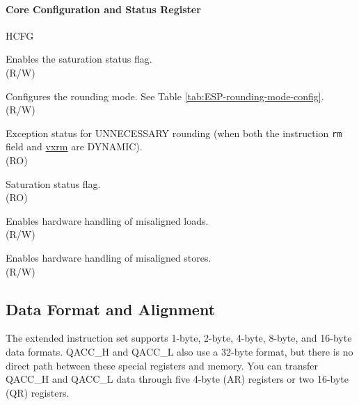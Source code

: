 \documentclass[main\_\_EN.tex]{subfiles}
\begin{document}
\paragraph{Core Configuration and Status Register}

\begin{register}{H}{CFG}{}\label{regdesc:ESPCFG}
%
%
%
%
%
%
%
\regnewline%
\begin{regdesc}\begin{reglist}
\label{vxsat_en}\item [vxsat\_en] Enables the saturation status flag.\\
(R/W)
\label{vxrm}\item [vxrm] Configures the rounding mode. See Table \ref{tab:ESP-rounding-mode-config}.\\
(R/W)
\label{rm_exc}\item [rm\_exc] Exception status for UNNECESSARY rounding (when both the instruction \lstinline{rm} field and \hyperref[vxrm]{vxrm} are DYNAMIC).\\
(RO)
\label{vxsat}\item [vxsat] Saturation status flag.\\
(RO)
\label{mis_ld}\item [mis\_ld] Enables hardware handling of misaligned loads.\\
(R/W)
\label{mis_st}\item [mis\_st] Enables hardware handling of misaligned stores.\\ (R/W)
\end{reglist}\end{regdesc}
\end{register}








\subsection{Data Format and Alignment}
\label{sec:pie-data-align}

The extended instruction set supports 1-byte, 2-byte, 4-byte, 8-byte, and 16-byte data formats. QACC\_H and QACC\_L also use a 32-byte format, but there is no direct path between these special registers and memory. You can transfer QACC\_H and QACC\_L data through five 4-byte (AR) registers or two 16-byte (QR) registers.
\end{document}
